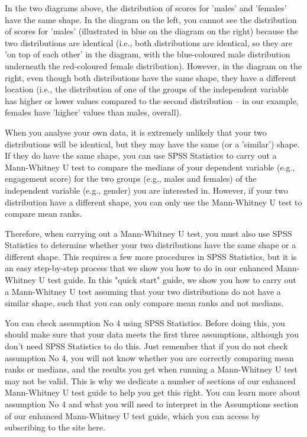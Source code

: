 \documentclass[]{article}
\begin{document}
In the two diagrams above, the distribution of scores for 'males' and 'females' have the same shape. In the diagram on the left, you cannot see the distribution of scores for 'males' (illustrated in blue on the diagram on the right) because the two distributions are identical (i.e., both distributions are identical, so they are 'on top of each other' in the diagram, with the blue-coloured male distribution underneath the red-coloured female distribution). However, in the diagram on the right, even though both distributions have the same shape, they have a different location (i.e., the distribution of one of the groups of the independent variable has higher or lower values compared to the second distribution – in our example, females have 'higher' values than males, overall).

When you analyse your own data, it is extremely unlikely that your two distributions will be identical, but they may have the same (or a 'similar') shape. If they do have the same shape, you can use SPSS Statistics to carry out a Mann-Whitney U test to compare the medians of your dependent variable (e.g., engagement score) for the two groups (e.g., males and females) of the independent variable (e.g., gender) you are interested in. However, if your two distribution have a different shape, you can only use the Mann-Whitney U test to compare mean ranks.

Therefore, when carrying out a Mann-Whitney U test, you must also use SPSS Statistics to determine whether your two distributions have the same shape or a different shape. This requires a few more procedures in SPSS Statistics, but it is an easy step-by-step process that we show you how to do in our enhanced Mann-Whitney U test guide. In this "quick start" guide, we show you how to carry out a Mann-Whitney U test assuming that your two distributions do not have a similar shape, such that you can only compare mean ranks and not medians.

You can check assumption No 4 using SPSS Statistics. Before doing this, you should make sure that your data meets the first three assumptions, although you don't need SPSS Statistics to do this. Just remember that if you do not check assumption No 4, you will not know whether you are correctly comparing mean ranks or medians, and the results you get when running a Mann-Whitney U test may not be valid. This is why we dedicate a number of sections of our enhanced Mann-Whitney U test guide to help you get this right. You can learn more about assumption No 4 and what you will need to interpret in the Assumptions section of our enhanced Mann-Whitney U test guide, which you can access by subscribing to the site here.
\end{document}
